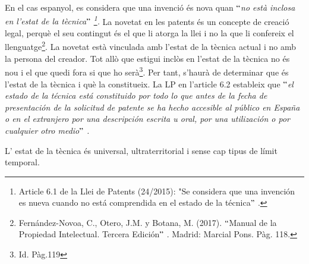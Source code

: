 \documentclass[12pt]{article}
\begin{document}
\begin{enumerate}
\vspace{\baselineskip}
\begin{justify}
En el cas espanyol, es considera que una invenció és nova quan \textit{$``$no està inclosa en l’estat de la tècnica$"$ \footnote{ Article 6.1 de la Llei de Patents (24/2015): "Se considera que una invención es nueva cuando no está comprendida en el estado de la técnica$"$ .  }. }La novetat en les patents és un concepte de creació legal, perquè el seu contingut és el que li atorga la llei i no la que li confereix el llenguatge\footnote{ Fernández-Novoa, C., Otero, J.M. y Botana, M. (2017). $``$Manual de la Propiedad Intelectual. Tercera Edición$"$ . Madrid: Marcial Pons. Pàg. 118.  }. La novetat està vinculada amb l’estat de la tècnica actual i no amb la persona del creador. Tot allò que estigui inclòs en l’estat de la tècnica no és nou i el que quedi fora si que ho serà\footnote{ Id. Pàg.119 }. Per tant, s’haurà de determinar que és l’estat de la tècnica i què la constitueix.  La LP en l’article 6.2 estableix que $``$\textit{el estado de la técnica está constituido por todo lo que antes de la fecha de presentación de la solicitud de patente se ha hecho accesible al público en España o en el extranjero por una descripción escrita u oral, por una utilización o por cualquier otro medio$"$ . }
\end{justify}\par

\begin{justify}
L’ estat de la tècnica és universal, ultraterritorial i sense cap tipus de límit temporal. 
\end{justify}\par



\end{enumerate}
\end{document}
